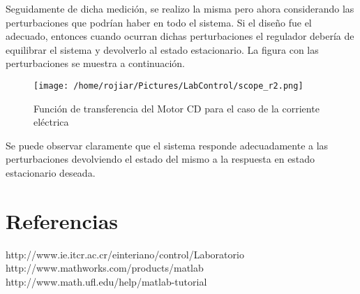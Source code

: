 \documentclass[a4paper,10pt,twocolumn]{article}
\begin{document}
Seguidamente de dicha medición, se realizo la misma pero ahora considerando las perturbaciones que podrían haber en todo el sistema. Si el 
diseño fue el adecuado, entonces cuando ocurran dichas perturbaciones el regulador debería de equilibrar el sistema y devolverlo al estado
estacionario. La figura con las perturbaciones se muestra a continuación.

\begin{figure}[h!]
\centering
\texttt{[image: /home/rojiar/Pictures/LabControl/scope\_r2.png]}
\caption{Función de transferencia del Motor CD para el caso de la corriente eléctrica}
\label{Funcion de transferencia del Motor CD para el caso de la corriente electrica}
\end{figure}

Se puede observar claramente que el sistema responde adecuadamente a las perturbaciones devolviendo el estado del mismo a la respuesta
en estado estacionario deseada.

\newpage
\section{Referencias}

http://www.ie.itcr.ac.cr/einteriano/control/Laboratorio
http://www.mathworks.com/products/matlab\\
http://www.math.ufl.edu/help/matlab-tutorial
\end{document}
